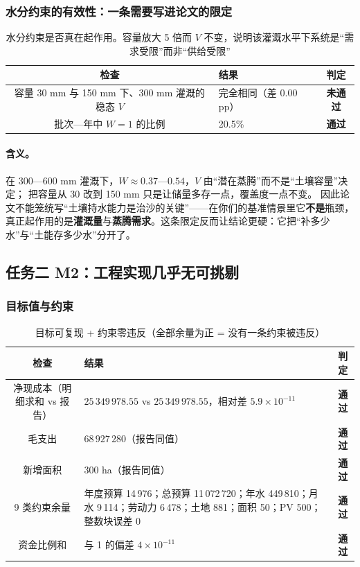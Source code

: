 \documentclass[11pt,a4paper]{ctexart}
\newcommand{\ok}{\textcolor{okc}{\textbf{通过}}}
\newcommand{\bad}{\textcolor{badc}{\textbf{未通过}}}
\begin{document}
\subsubsection{水分约束的有效性：一条需要写进论文的限定}\label{sec:cap}

\begin{table}[htbp]\centering\small
\begin{tabularx}{\textwidth}{|c|X|c|}
\toprule
检查 & 结果 & 判定 \\
\midrule
容量 30 mm 与 150 mm 下、300 mm 灌溉的稳态 $V$ & 完全相同（差 $0.00$ pp） & \bad \\
批次—年中 $W=1$ 的比例 & 20.5\% & \ok \\
\bottomrule
\end{tabularx}
\caption{水分约束是否真在起作用。容量放大 5 倍而 $V$ 不变，说明该灌溉水平下系统是“需求受限”而非“供给受限”}\label{tab:cap}
\end{table}

\paragraph{含义。}
在 300—600 mm 灌溉下，$W\approx0.37$—$0.54$，$V$ 由“潜在蒸腾”而不是“土壤容量”决定；
把容量从 30 改到 150 mm 只是让储量多存一点，覆盖度一点不变。
因此论文不能笼统写“土壤持水能力是治沙的关键”——在你们的基准情景里它\textbf{不是}瓶颈，
真正起作用的是\textbf{灌溉量}与\textbf{蒸腾需求}。这条限定反而让结论更硬：它把“补多少水”与“土能存多少水”分开了。

\subsection{任务二 M2：工程实现几乎无可挑剔}

\subsubsection{目标值与约束}

\begin{table}[htbp]\centering\small
\begin{tabularx}{\textwidth}{|c|X|c|}
\toprule
检查 & 结果 & 判定 \\
\midrule
净现成本（明细求和 vs 报告） & $25\,349\,978.55$ vs $25\,349\,978.55$，相对差 $5.9\times10^{-11}$ & \ok \\
毛支出 & $68\,927\,280$（报告同值） & \ok \\
新增面积 & $300$ ha（报告同值） & \ok \\
9 类约束余量 & 年度预算 14\,976；总预算 11\,072\,720；年水 449\,810；月水 9\,114；劳动力 6\,478；土地 881；面积 50；PV 500；整数块误差 0 & \ok \\
资金比例和 & 与 1 的偏差 $4\times10^{-11}$ & \ok \\
\bottomrule
\end{tabularx}
\caption{目标可复现 + 约束零违反（全部余量为正 = 没有一条约束被违反）}\label{tab:m2cons}
\end{table}
\end{document}

